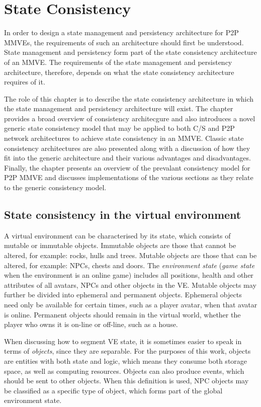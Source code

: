 \chapter{State Consistency}
\label{chp:CONSISTENCY}

In order to design a state management and persistency architecture for P2P MMVEs, the requirements of such an architecture should first be understood. State management and persistency form part of the state consistency architecture of an MMVE. The requirements of the state management and persistency architecture, therefore, depends on what the state consistency architecture requires of it.

The role of this chapter is to describe the state consistency architecture in which the state management and persistency architecture will exist. The chapter provides a broad overview of consistency architecgure and also introduces a novel generic state consistency model that may be applied to both C/S and P2P network architectures to achieve state consistency in an MMVE. Classic state consistency architectures are also presented along with a discussion of how they fit into the generic architecture and their various advantages and disadvantages. Finally, the chapter presents an overview of the prevalant consistency model for P2P MMVE and discusses implementations of the various sections as they relate to the generic consistency model.

\section{State consistency in the virtual environment}

A virtual environment can be characterised by its state, which consists of mutable or immutable objects. Immutable objects are those that cannot be altered, for example: rocks, hulls and trees. Mutable objects are those that can be altered, for example: NPCs, chests and doors. The \emph{environment state} (\emph{game state} when the environment is an online game) includes all positions, health and other attributes of all avatars, NPCs and other objects in the VE. Mutable objects may further be divided into ephemeral and permanent objects. Ephemeral objects need only be available for certain times, such as a player avatar, when that avatar is online. Permanent objects should remain in the virtual world, whether the player who owns it is on-line or off-line, such as a house.

When discussing how to segment VE state, it is sometimes easier to speak in terms of \emph{objects}, since they are separable. For the purposes of this work, objects are entities with both state and logic, which means they consume both storage space, as well as computing resources. Objects can also produce events, which should be sent to other objects. When this definition is used, NPC objects may be classified as a specific type of object, which forms part of the global environment state.

